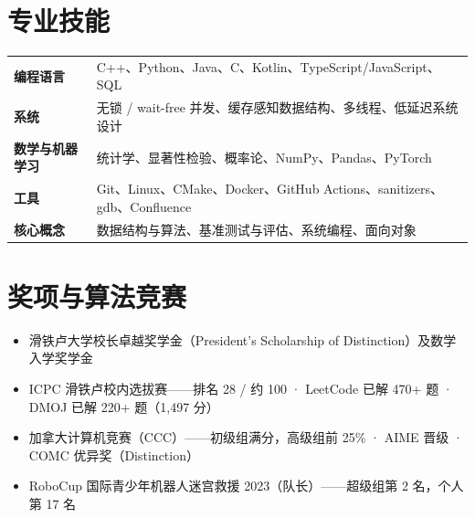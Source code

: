 \documentclass[a4paper,11pt]{article}
\newenvironment{bullets}
  {\begin{itemize}[leftmargin=1.5em,labelsep=0.5em,itemsep=1.5pt,topsep=1.5pt,parsep=0pt,partopsep=0pt]\small}
  {\end{itemize}\vspace{1pt}}
\begin{document}
\section{专业技能}
\begin{tabularx}{\textwidth}{@{}l X@{}}
  \textbf{编程语言} & C++、Python、Java、C、Kotlin、TypeScript/JavaScript、SQL\\
  \textbf{系统} & 无锁 / wait-free 并发、缓存感知数据结构、多线程、低延迟系统设计\\
  \textbf{数学与机器学习} & 统计学、显著性检验、概率论、NumPy、Pandas、PyTorch\\
  \textbf{工具} & Git、Linux、CMake、Docker、GitHub Actions、sanitizers、gdb、Confluence\\
  \textbf{核心概念} & 数据结构与算法、基准测试与评估、系统编程、面向对象\\
\end{tabularx}

\section{奖项与算法竞赛}
\begin{bullets}
  \item 滑铁卢大学校长卓越奖学金（President's Scholarship of Distinction）及数学入学奖学金
  \item ICPC 滑铁卢校内选拔赛——排名 28 / 约 100 · LeetCode 已解 470+ 题 · DMOJ 已解 220+ 题（1{,}497 分）
  \item 加拿大计算机竞赛（CCC）——初级组满分，高级组前 25\% · AIME 晋级 · COMC 优异奖（Distinction）
  \item RoboCup 国际青少年机器人迷宫救援 2023（队长）——超级组第 2 名，个人第 17 名
\end{bullets}
\end{document}
